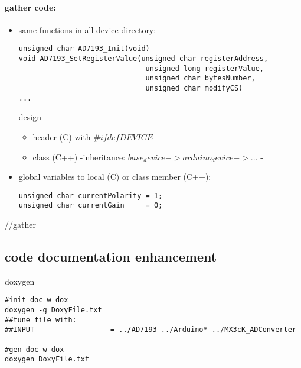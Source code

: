 \documentclass[10pt,a4paper]{report}
\begin{document}
\paragraph*{gather code:}
\begin{itemize}
\item same functions in all device directory:
\begin{lstlisting}
unsigned char AD7193_Init(void)
void AD7193_SetRegisterValue(unsigned char registerAddress,
                              unsigned long registerValue,
                              unsigned char bytesNumber,
                              unsigned char modifyCS)
...
\end{lstlisting}
design
\begin{itemize}
\item header (C) with $\#ifdef DEVICE$
\item class (C++) -inheritance: $base_device->arduino_device->...$ -
\end{itemize}

\item global variables to local (C) or class member (C++):
\begin{lstlisting}
unsigned char currentPolarity = 1;
unsigned char currentGain     = 0;
\end{lstlisting}

\end{itemize}//gather

\subsection{code documentation enhancement}
doxygen
\begin{lstlisting}
#init doc w dox
doxygen -g DoxyFile.txt
##tune file with:
##INPUT                  = ../AD7193 ../Arduino* ../MX3cK_ADConverter

#gen doc w dox
doxygen DoxyFile.txt
\end{lstlisting}
\end{document}
